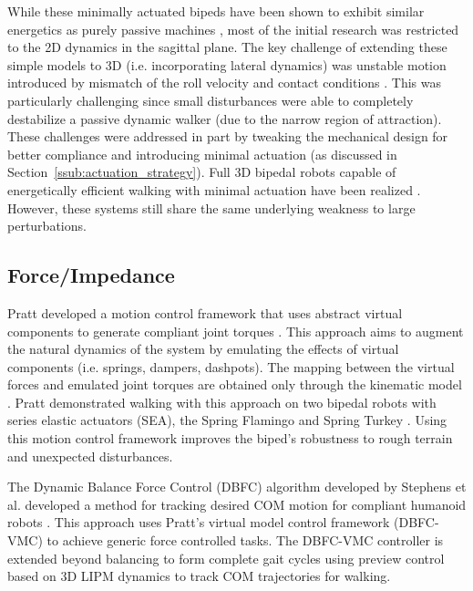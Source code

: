 While these minimally actuated bipeds have been shown to exhibit similar energetics as purely passive machines \cite{Asano:2004jp}, most of the initial research was restricted to the 2D dynamics in the sagittal plane. The key challenge of extending these simple models to 3D (i.e. incorporating lateral dynamics) was unstable motion introduced by mismatch of the roll velocity and contact conditions \cite{Kuo:1999tn}. This was particularly challenging since small disturbances were able to completely destabilize a passive dynamic walker (due to the narrow region of attraction). These challenges were addressed in part by tweaking the mechanical design for better compliance and introducing minimal actuation (as discussed in Section~\ref{ssub:actuation_strategy}). Full 3D bipedal robots capable of energetically efficient walking with minimal actuation have been realized \cite{Collins:2005vp,Anderson:2005cw,Hobbelen2008}. However, these systems still share the same underlying weakness to large perturbations. 


\subsection{Force/Impedance} %
\label{sub:related_force_impedance}
Pratt developed a motion control framework that uses abstract virtual components to generate compliant joint torques \cite{Pratt:1995ww}. This approach aims to augment the natural dynamics of the system by emulating the effects of virtual components (i.e. springs, dampers, dashpots). The mapping between the virtual forces and emulated joint torques are obtained only through the kinematic model \cite{Pratt:1998cf}. Pratt demonstrated walking with this approach on two bipedal robots with series elastic actuators (SEA), the Spring Flamingo and Spring Turkey \cite{Pratt:2001vu}. Using this motion control framework improves the biped's robustness to rough terrain and unexpected disturbances.

The Dynamic Balance Force Control (DBFC) algorithm developed by Stephens et al. developed a method for tracking desired COM motion for compliant humanoid robots \cite{Stephens:2010fj}. This approach uses Pratt's virtual model control framework (DBFC-VMC) to achieve generic force controlled tasks. The DBFC-VMC controller is extended beyond balancing to form complete gait cycles using preview control \cite{KajitaEtAlICRA2003} based on 3D LIPM dynamics to track COM trajectories for walking. 

